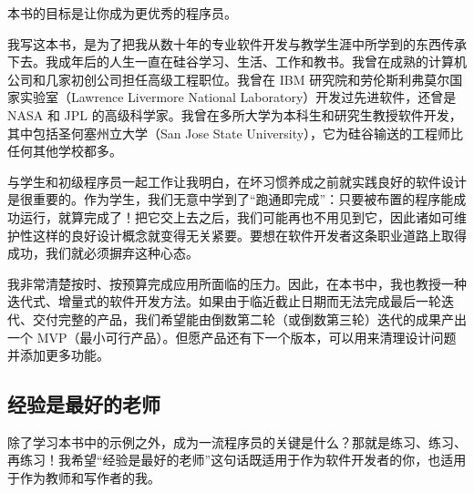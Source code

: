 本书的目标是让你成为更优秀的程序员。

我写这本书，是为了把我从数十年的专业软件开发与教学生涯中所学到的东西传承下去。我成年后的人生一直在硅谷学习、生活、工作和教书。我曾在成熟的计算机公司和几家初创公司担任高级工程职位。我曾在 IBM 研究院和劳伦斯利弗莫尔国家实验室（Lawrence Livermore National Laboratory）开发过先进软件，还曾是 NASA 和 JPL 的高级科学家。我曾在多所大学为本科生和研究生教授软件开发，其中包括圣何塞州立大学（San Jose State University），它为硅谷输送的工程师比任何其他学校都多。

与学生和初级程序员一起工作让我明白，在坏习惯养成之前就实践良好的软件设计是很重要的。作为学生，我们无意中学到了“跑通即完成”：只要被布置的程序能成功运行，就算完成了！把它交上去之后，我们可能再也不用见到它，因此诸如可维护性这样的良好设计概念就变得无关紧要。要想在软件开发者这条职业道路上取得成功，我们就必须摒弃这种心态。

我非常清楚按时、按预算完成应用所面临的压力。因此，在本书中，我也教授一种迭代式、增量式的软件开发方法。如果由于临近截止日期而无法完成最后一轮迭代、交付完整的产品，我们希望能由倒数第二轮（或倒数第三轮）迭代的成果产出一个 MVP（最小可行产品）。但愿产品还有下一个版本，可以用来清理设计问题并添加更多功能。

\subsection{经验是最好的老师}

除了学习本书中的示例之外，成为一流程序员的关键是什么？那就是练习、练习、再练习！我希望“经验是最好的老师”这句话既适用于作为软件开发者的你，也适用于作为教师和写作者的我。
